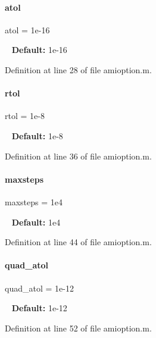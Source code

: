 \paragraph{\texorpdfstring{atol}{atol}}
{\footnotesize\ttfamily atol = 1e-\/16}

~\newline
{\bfseries{Default\+:}} 1e-\/16 

Definition at line 28 of file amioption.\+m.

\mbox{\label{classamioption_a7978e9a4674f869e6b2950e2f6262ca5}} 
\paragraph{\texorpdfstring{rtol}{rtol}}
{\footnotesize\ttfamily rtol = 1e-\/8}

~\newline
{\bfseries{Default\+:}} 1e-\/8 

Definition at line 36 of file amioption.\+m.

\mbox{\label{classamioption_ac37622882dacee1f11688d4941ccb45e}} 
\paragraph{\texorpdfstring{maxsteps}{maxsteps}}
{\footnotesize\ttfamily maxsteps = 1e4}

~\newline
{\bfseries{Default\+:}} 1e4 

Definition at line 44 of file amioption.\+m.

\mbox{\label{classamioption_ad77eb68a40bc4659c33df68b373f3fd7}} 
\paragraph{\texorpdfstring{quad\_atol}{quad\_atol}}
{\footnotesize\ttfamily quad\+\_\+atol = 1e-\/12}

~\newline
{\bfseries{Default\+:}} 1e-\/12 

Definition at line 52 of file amioption.\+m.

